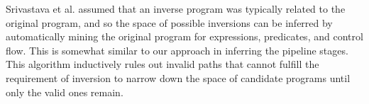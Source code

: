 \documentclass[runningheads,a4paper,orivec]{llncs}
\begin{document}
{Srivastava et al. \cite{prog_inv_rev,program_inversion_11} assumed that an inverse program was typically related to the original program,
and so the space of possible inversions can be inferred by automatically
mining the original program for expressions, predicates, and control flow.
This is somewhat similar to our approach in inferring the pipeline stages.
This algorithm inductively rules out invalid paths that cannot fulfill the requirement of inversion
to narrow down the space of candidate programs until only the valid ones remain.

% 
% 


}
\end{document}
